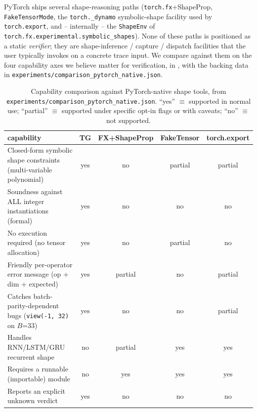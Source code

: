 \documentclass{article}
\theoremstyle{definition}
\begin{document}
PyTorch ships several shape-reasoning paths
(\verb|torch.fx|+ShapeProp, \verb|FakeTensorMode|, the
\verb|torch._dynamo| symbolic-shape facility used by
\verb|torch.export|, and -- internally -- the \verb|ShapeEnv| of
\verb|torch.fx.experimental.symbolic_shapes|). None of these
paths is positioned as a static \emph{verifier}; they are
shape-inference / capture / dispatch facilities that the user
typically invokes on a concrete trace input. We compare against
them on the four capability axes we believe matter for
verification, in , with the
backing data in \verb|experiments/comparison_pytorch_native.json|.

\begin{table}[t]
\centering\scriptsize
\caption{Capability comparison against PyTorch-native shape tools,
from \texttt{experiments/comparison\_pytorch\_native.json}. ``yes''
$\equiv$ supported in normal use; ``partial'' $\equiv$ supported
under specific opt-in flags or with caveats; ``no'' $\equiv$ not
supported.}
\label{tab:pytorch-native-comparison}
\begin{tabular}{p{6.0cm}cccc}
\toprule
capability & TG & FX+ShapeProp & FakeTensor & torch.export \\
\midrule
Closed-form symbolic shape constraints (multi-variable polynomial)
                       & yes     & no       & partial & partial \\
Soundness against ALL integer instantiations (formal)
                       & yes     & no       & no      & no \\
No execution required (no tensor allocation)
                       & yes     & no       & partial & no \\
Friendly per-operator error message (op + dim + expected)
                       & yes     & partial  & no      & partial \\
Catches batch-parity-dependent bugs (\verb|view(-1, 32)| on $B$=$33$)
                       & yes     & no       & no      & partial \\
Handles RNN/LSTM/GRU recurrent shape
                       & no      & partial  & yes     & yes \\
Requires a runnable (importable) module
                       & no      & yes      & yes     & yes \\
Reports an explicit \textsf{unknown} verdict
                       & yes     & no       & no      & no \\
\bottomrule
\end{tabular}
\end{table}
\end{document}
